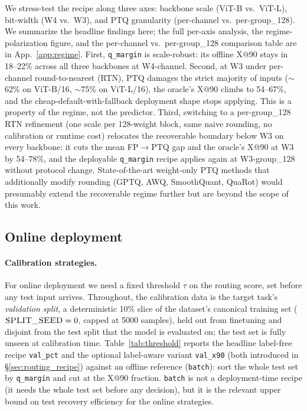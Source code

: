 \documentclass{article}
\newcommand{\fp}{\textsc{FP}\xspace}
\newcommand{\ptq}{\textsc{PTQ}\xspace}
\begin{document}
We stress-test the recipe along three axes: backbone scale (ViT-B vs.\ ViT-L), bit-width (W4 vs.\ W3), and PTQ granularity (per-channel vs.\ per-group\_128). We summarize the headline findings here; the full per-axis analysis, the regime-polarization figure, and the per-channel vs.\ per-group\_128 comparison table are in App.~\ref{app:regime}.
First, \texttt{q\_margin} is scale-robust: its offline X@90 stays in 18--22\% across all three backbones at W4-channel.
Second, at W3 under per-channel round-to-nearest (RTN), PTQ damages the strict majority of inputs ($\sim$62\% on ViT-B/16, $\sim$75\% on ViT-L/16), the oracle's X@90 climbs to 54--67\%, and the cheap-default-with-fallback deployment shape stops applying. This is a property of the regime, not the predictor.
Third, switching to a per-group\_128 RTN refinement (one scale per 128-weight block, same naive rounding, no calibration or runtime cost) relocates the recoverable boundary below W3 on every backbone: it cuts the mean \fp$\to$\ptq{} gap and the oracle's X@90 at W3 by 54--78\%, and the deployable \texttt{q\_margin} recipe applies again at W3-group\_128 without protocol change. State-of-the-art weight-only PTQ methods that additionally modify rounding (GPTQ, AWQ, SmoothQuant, QuaRot) would presumably extend the recoverable regime further but are beyond the scope of this work.

\subsection{Online deployment}
\label{sec:online}

\paragraph{Calibration strategies.}
For online deployment we need a fixed threshold $\tau$ on the routing score, set before any test input arrives. Throughout, the calibration data is the target task's \emph{validation split}, a deterministic 10\% slice of the dataset's canonical training set ($\textsc{SPLIT\_SEED}=0$, capped at 5000 samples), held out from finetuning and disjoint from the test split that the model is evaluated on; the test set is fully unseen at calibration time. Table~\ref{tab:threshold} reports the headline label-free recipe \texttt{val\_pct} and the optional label-aware variant \texttt{val\_x90} (both introduced in \S\ref{sec:routing_recipe}) against an offline reference (\texttt{batch}): sort the whole test set by \texttt{q\_margin} and cut at the X@90 fraction. \texttt{batch} is not a deployment-time recipe (it needs the whole test set before any decision), but it is the relevant upper bound on test recovery efficiency for the online strategies.
\end{document}
